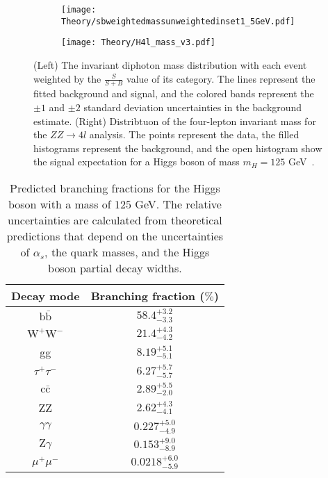 \begin{figure}[h!]
 
\begin{subfigure}{0.5\textwidth}
\texttt{[image: Theory/sbweightedmassunweightedinset1\_5GeV.pdf]} 
\end{subfigure}
\begin{subfigure}{0.5\textwidth}
\texttt{[image: Theory/H4l\_mass\_v3.pdf]}
\end{subfigure}
 
\caption{(Left) The invariant diphoton mass distribution with each event weighted by the $\frac{S}{S+B}$ value of its category. The lines represent the fitted background and signal, and the colored bands represent the $\pm1$ and $\pm2$ standard deviation uncertainties in the background estimate. (Right) Distribtuon of the four-lepton invariant mass for the $ZZ\rightarrow 4l$ analysis. The points represent the data, the filled histograms represent the background, and the open histogram show the signal expectation for a Higgs boson of mass $m_{H}=125$ GeV~\cite{CMSHiggs}.}
\label{fig:HiggsMeasurement}
\end{figure}

{\renewcommand{\arraystretch}{1.5}
\begin{table}[h!]
\begin{center}
    \begin{tabular}{c c}
    \hline
    \hline
    Decay mode &  Branching fraction ($\%$) \\
    \hline
    $\mathrm{b\bar{b}}$ &  $58.4^{+3.2}_{-3.3}$\\
    $\mathrm{W^{+}W^{-}}$ & $21.4^{+4.3}_{-4.2}$ \\
    gg & $8.19^{+5.1}_{-5.1}$ \\
    $\tau^{+}\tau^{-}$ & $6.27^{+5.7}_{-5.7}$  \\
    $\mathrm{c\bar{c}}$ & $2.89^{+5.5}_{-2.0}$ \\
    ZZ & $2.62^{+4.3}_{-4.1}$ \\
    $\gamma\gamma$ & $0.227^{+5.0}_{-4.9}$ \\
    $\mathrm{Z}\gamma$ & $0.153^{+9.0}_{-8.9}$ \\
    $\mu^{+}\mu^{-}$ & $0.0218^{+6.0}_{-5.9}$ \\
    \hline
    \hline
    \end{tabular}
    \caption{Predicted branching fractions for the Higgs boson with a mass of $125$ GeV. The relative uncertainties are calculated from theoretical predictions that depend on the uncertainties of $\alpha_{s}$, the quark masses, and the Higgs boson partial decay widths.}\label{tab:HiggsBR}
\end{center}
\end{table}}


